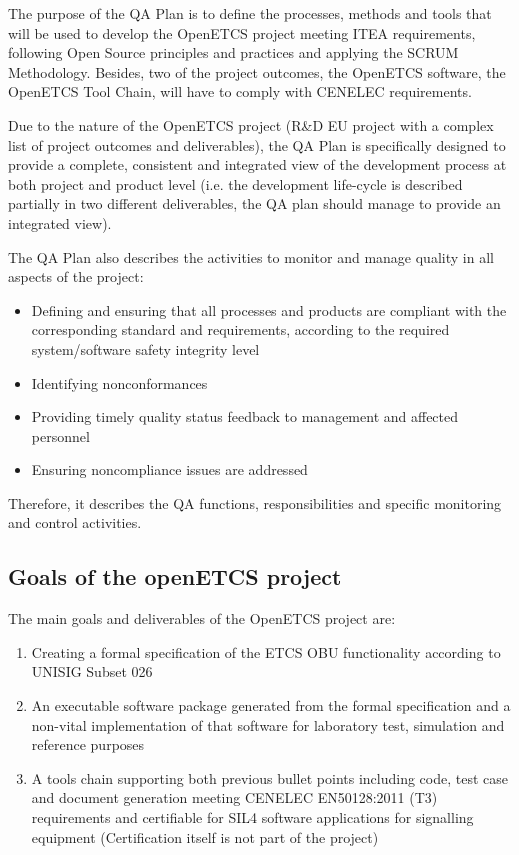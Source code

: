 \documentclass{template/openetcs_article}
\begin{document}
The purpose of the QA Plan is to define the processes, methods and tools that will be used to develop the OpenETCS project meeting ITEA requirements, following Open Source principles and practices and applying the SCRUM Methodology. Besides, two of the project outcomes, the OpenETCS software, the OpenETCS Tool Chain, will have to comply with CENELEC requirements.

Due to the nature of the OpenETCS project (R\&D EU project with a complex list of project outcomes and deliverables), the QA Plan is specifically designed to provide a complete, consistent and integrated view of the development process at both project and product level (i.e. the development life-cycle is described partially in two different deliverables, the QA plan should manage to provide an integrated view).

The QA Plan also describes the activities to monitor and manage quality in all aspects of the project:

\begin{itemize}
\item Defining and ensuring that all processes and products are compliant with the corresponding standard and requirements, according to the required system/software safety integrity level
\item Identifying nonconformances
\item Providing timely quality status feedback to management and affected personnel
\item Ensuring noncompliance issues are addressed
\end{itemize}

Therefore, it describes the QA functions, responsibilities and specific monitoring and control activities.


\subsection{Goals of the openETCS project}

The main goals and deliverables of the OpenETCS project are:
\begin{enumerate}
\item Creating a formal specification of the ETCS OBU functionality according to UNISIG Subset 026

\item An executable software package generated from the formal specification and a non-vital implementation of that software for laboratory test, simulation and reference purposes

\item A tools chain supporting both previous bullet points including code, test case and document generation meeting CENELEC EN50128:2011 (T3) requirements and certifiable for SIL4 software applications for signalling equipment (Certification itself is not part of the project)
\end{enumerate}
\end{document}
